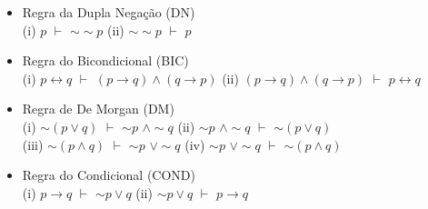 \documentclass[12pt,a4paper,oneside]{article}
\begin{document}
\begin{itemize}
	\item Regra da Dupla Negação (DN) \\
	(i) $p$ $\vdash$ $\sim \sim p$ \hspace*{0.5cm} (ii)  $\sim \sim p$ $\vdash$ $p$
	\item Regra do Bicondicional (BIC) \\
	(i) $p \leftrightarrow q$ $\vdash$ $(p \rightarrow q) \wedge (q \rightarrow p)$ \hspace*{0.5cm} (ii)  $(p \rightarrow q) \wedge (q \rightarrow p)$ $\vdash$ $p \leftrightarrow q$
	\item Regra de De Morgan (DM) \\
	(i) $\sim (p \vee q)$ $\vdash$ $\sim p$ $\wedge \sim q$ \hspace*{0.5cm} (ii) $\sim p$ $\wedge \sim q$ $\vdash$ $\sim (p \vee q)$ \\
	(iii) $\sim (p \wedge q)$ $\vdash$ $\sim p$ $\vee \sim q$ \hspace*{0.5cm} (iv) $\sim p$ $\vee \sim q$ $\vdash$ $\sim (p \wedge q)$
	\item Regra do Condicional (COND) \\
	(i) $p \rightarrow q$ $\vdash$ $\sim p \vee q$ \hspace*{0.5cm} (ii)  $\sim p \vee q$ $\vdash$ $p \rightarrow q$
\end{itemize}
\end{document}
